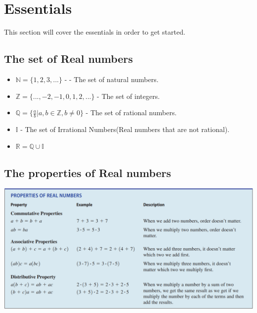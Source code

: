 \section{Essentials}
This section will cover the essentials in order to get started. 
\subsection{The set of Real numbers}
\begin{itemize}
    \item $\mathbb{N} = \{1, 2, 3, ...\}$ - - The set of natural numbers. 
    \item $\mathbb{Z} = \{..., -2, -1, 0, 1, 2, ...\}$ - The set of integers.
    \item $\mathbb{Q} = \{\frac{a}{b} | a, b \in \mathbb{Z}, b \neq 0\}$ - The set of rational numbers. 
    \item $\mathbb{I}$ - The set of Irrational Numbers(Real numbers that are not rational). 
    \item $\mathbb{R} = \mathbb{Q} \cup \mathbb{I}$
\end{itemize}


\subsection{The properties of Real numbers}
\includegraphics[width=1.1\textwidth]{algebra-pre-calculus/algebra/essentials/properties.png}

